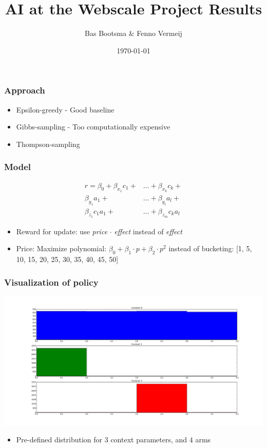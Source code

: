 \documentclass{beamer}
\title[AI@Webscale Presentation]{
  AI at the Webscale Project Results}
\author[Bas Bootsma, Fenno Vermeij]{Bas Bootsma \& Fenno Vermeij}
\institute[Radboud University Nijmegen]{Radboud University Nijmegen}
\date{\today}
\begin{document}
\begin{frame}
  \titlepage
\end{frame}

\begin{frame}
	\frametitle{Approach}	
	\begin{itemize}
		\item Epsilon-greedy - Good baseline
		\item Gibbs-sampling - Too computationally expensive
		\item Thompson-sampling
	\end{itemize}
\end{frame}

\begin{frame}
	\frametitle{Model}
	
		\begin{align*} r = \beta_0 + \beta_{x_1} c_1 + &\ldots + \beta_{x_k} c_k + \\
	    \beta_{y_1} a_1 + &\ldots + \beta_{y_l} a_l + \\
	    \beta_{z_1} c_1a_1 + &\ldots + \beta_{z_m} c_ka_l 
	    \end{align*}
	    \begin{itemize}
		\item  Reward for update: use \emph{price} $\cdot$ \emph{effect} instead of \emph{effect}
		\item  Price: Maximize polynomial: $\beta_0 + \beta_1 \cdot p + \beta_2 \cdot p^2$ instead of bucketing: [1, 5, 10, 15, 20, 25, 30, 35, 40, 45, 50]
	\end{itemize}
\end{frame}

\begin{frame}
	\frametitle{Visualization of policy}
	\includegraphics[width=\textwidth]{test.png}
	\begin{itemize}
		\item Pre-defined distribution for $3$ context parameters, and $4$ arms
	\end{itemize}
\end{frame}
\end{document}
